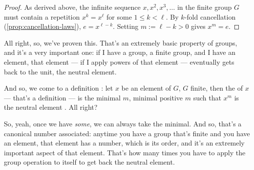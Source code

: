 \begin{content}

\begin{proof}
As derived above, the infinite sequence $x, x^2, x^3, \dots$ in the finite group $G$ must contain a repetition $x^k = x^\ell$ for some $1 \le k < \ell$. By $k$-fold cancellation (\cref{prop:cancellation-laws}), $e = x^{\ell - k}$. Setting $m := \ell - k > 0$ gives $x^m = e$.
\end{proof}

\end{content}

\begin{speech}[01:21:56 - 01:23:02]
All right, so, we've proven this. That's an extremely basic property of groups, and it's a very important one: if I have a group, a finite group, and I have an element, that element --- if I apply powers of that element --- eventually gets back to the unit, the neutral element.

And so, we come to a definition : let $x$ be an element of $G$, $G$ finite, then the  of $x$  --- that's a definition --- is the minimal $m$, minimal positive $m$ such that $x^m$ is the neutral element . All right?

So, yeah, once we have \emph{some}, we can always take the minimal. And so, that's a canonical number associated: anytime you have a group that's finite and you have an element, that element has a number, which is its order, and it's an extremely important aspect of that element. That's how many times you have to apply the group operation to itself to get back the neutral element.
\end{speech}

